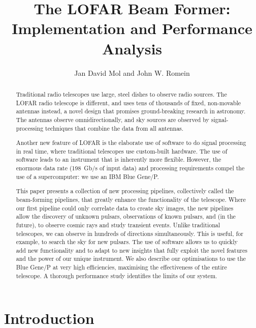\documentclass{llncs}
\begin{document}
\newcommand{\comment}[1]{}

\author{Jan David Mol and John W. Romein}
\title{The LOFAR Beam Former: \\ Implementation and Performance Analysis}
\maketitle


\begin{abstract}
Traditional radio telescopes use large, steel dishes to observe radio sources. The LOFAR radio telescope is different, and uses tens of thousands of fixed, non-movable antennas instead, a novel design that promises ground-breaking research in astronomy. The antennas observe omnidirectionally, and sky sources are observed by signal-processing techniques that combine the data from all antennas.

Another new feature of LOFAR is the elaborate use of software to do signal processing in real time, where traditional telescopes use custom-built hardware. The use of software leads to an instrument that is inherently more flexible. However, the enormous data rate (198~Gb/s of input data) and processing requirements compel the use of a supercomputer: we use an IBM Blue Gene/P.

This paper presents a collection of new processing pipelines, collectively called the beam-forming pipelines, that greatly enhance the functionality of the telescope. Where our first pipeline could only correlate data to create sky images, the new pipelines allow the discovery of unknown pulsars, observations of known pulsars, and (in the future), to observe cosmic rays and study transient events. Unlike traditional telescopes, we can observe in hundreds of directions simultaneously. This is useful, for example, to search the sky for new pulsars. The use of software allows us to quickly add new functionality and to adapt to new insights that fully exploit the novel features and the power of our unique instrument. We also describe our optimisations to use the Blue Gene/P at very high efficiencies, maximising the effectiveness of the entire telescope. A thorough performance study identifies the limits of our system.
\end{abstract}
\section{Introduction}
\end{document}
